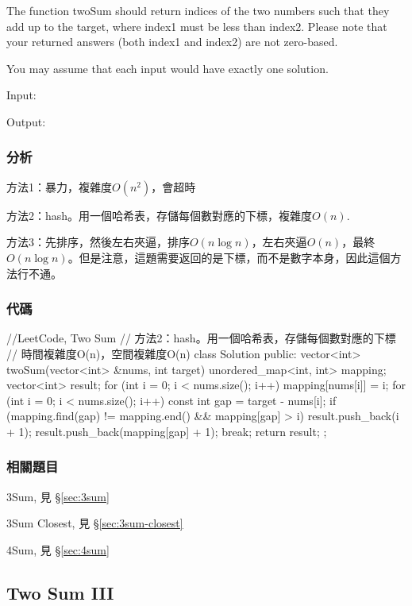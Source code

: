 The function twoSum should return indices of the two numbers such that they add up to the target, where index1 must be less than index2. Please note that your returned answers (both index1 and index2) are not zero-based.

You may assume that each input would have exactly one solution.

Input:  

Output: 


\subsubsection{分析}
方法1：暴力，複雜度$O(n^2)$，會超時

方法2：hash。用一個哈希表，存儲每個數對應的下標，複雜度$O(n)$.

方法3：先排序，然後左右夾逼，排序$O(n\log n)$，左右夾逼$O(n)$，最終$O(n\log n)$。但是注意，這題需要返回的是下標，而不是數字本身，因此這個方法行不通。


\subsubsection{代碼}
\begin{Code}
//LeetCode, Two Sum
// 方法2：hash。用一個哈希表，存儲每個數對應的下標
// 時間複雜度O(n)，空間複雜度O(n)
class Solution {
public:
    vector<int> twoSum(vector<int> &nums, int target) {
        unordered_map<int, int> mapping;
        vector<int> result;
        for (int i = 0; i < nums.size(); i++) {
            mapping[nums[i]] = i;
        }
        for (int i = 0; i < nums.size(); i++) {
            const int gap = target - nums[i];
            if (mapping.find(gap) != mapping.end() && mapping[gap] > i) {
                result.push_back(i + 1);
                result.push_back(mapping[gap] + 1);
                break;
            }
        }
        return result;
    }
};
\end{Code}


\subsubsection{相關題目}
\begindot
\item 3Sum, 見 \S \ref{sec:3sum}
\item 3Sum Closest, 見 \S \ref{sec:3sum-closest}
\item 4Sum, 見 \S \ref{sec:4sum}
\myenddot

\subsection{Two Sum III} %
\label{sec:Two-sum-iii}


